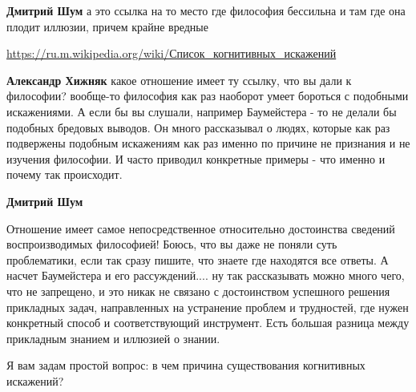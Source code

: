 \begin{itemize}
\begin{itemize}
 
\textbf{Дмитрий Шум} а это ссылка на то место где философия бессильна и там где она плодит иллюзии, причем крайне вредные

\url{https://ru.m.wikipedia.org/wiki/Список_когнитивных_искажений}\par

 
\textbf{Александр Хижняк} какое отношение имеет ту ссылку, что вы дали к
философии? вообще-то философия как раз наоборот умеет бороться с подобными
искажениями. А если бы вы слушали, например Баумейстера - то не делали бы
подобных бредовых выводов. Он много рассказывал о людях, которые как раз
подвержены подобным искажениям как раз именно по причине не признания и не
изучения философии. И часто приводил конкретные примеры - что именно и почему
так происходит.

 
\textbf{Дмитрий Шум} 

Отношение имеет самое непосредственное относительно достоинства сведений
воспроизводимых философией! Боюсь, что вы даже не поняли суть проблематики,
если так сразу пишите, что знаете где находятся все ответы. А насчет
Баумейстера и его рассуждений.... ну так рассказывать можно много чего, что не
запрещено, и это никак не связано с достоинством успешного решения прикладных
задач, направленных на устранение проблем и трудностей, где нужен конкретный
способ и соответствующий инструмент. Есть большая разница между прикладным
знанием и иллюзией о знании.

Я вам задам простой вопрос: в чем причина существования когнитивных искажений?

 

\end{itemize}
\end{itemize}
